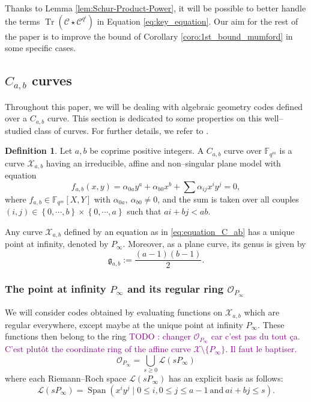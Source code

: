 \documentclass[a4paper]{amsart}
\theoremstyle{definition}
\newtheorem{definition}[thm]{Definition}
\theoremstyle{remark}
\newcommand{\calL}{\mathcal{L}}
\newcommand{\calC}{\mathcal{C}}
\newcommand{\calO}{\mathcal{O}}
\newcommand{\calX}{\mathcal{X}}
\newcommand{\fqm}{\mathbb{F}_{q^m}}
\newcommand{\Tr}[1]{\operatorname{Tr}\left(#1\right)}
\newcommand{\set}[1]{\left\{#1\right\}}
\newcommand{\Span}[1]{\operatorname{Span}\left(#1\right)}
\newcommand\jade[1]{\textcolor{purple}{#1}}
\begin{document}
Thanks to Lemma \ref{lem:Schur-Product-Power}, it will be possible to better handle the terms $\Tr{\calC\star \calC^{q^i}}$ in Equation \eqref{eq:key_equation}. Our aim for the rest of the paper is to improve the bound of Corollary \ref {coro:1st_bound_mumford} in some specific cases.

\subsection{$C_{a,b}$ curves} \label{section:C_a,b_codes}
Throughout this paper, we will be dealing with algebraic geometry codes defined over a $C_{a,b}$ curve. This section is dedicated to some properties on this well--studied class of curves. For further details, we refer to \cite{Miu93}. 

\begin{definition} \label{def:C_ab_curves} 
Let $a,b$ be coprime positive integers. A $C_{a,b}$ curve over $\fqm$ is a curve $\calX_{a,b}$ having an irreducible, affine and non--singular plane model with equation
\begin{equation} \label{eq:equation_C_ab}
f_{a,b}(x,y) = \alpha_{0a}y^a + \alpha_{b0}x^b + \sum \alpha_{ij}x^iy^j = 0,
\end{equation}
where $f_{a,b} \in \fqm[X,Y]$ with $\alpha_{0a}, \: \alpha_{b0} \neq 0$, and the sum is taken over all couples $(i,j) \in \set{0,\cdots,b} \times \set{0,\cdots,a}$ such that $ai+bj < ab$.
\end{definition}
Any curve $\calX_{a,b}$ defined by an equation as in \eqref{eq:equation_C_ab} has a unique point at infinity, denoted by $P_{\infty}$. Moreover, as a plane curve, its genus is given by
\[\mathfrak{g}_{a,b}:=\dfrac{(a-1)(b-1)}{2}.\]

\subsubsection{The point at infinity $P_\infty$ and its regular ring $\calO_{P_\infty}$}

We will consider codes obtained by evaluating functions on $\calX_{a,b}$ which are regular everywhere, except maybe at the unique point at infinity $P_\infty$. These functions then belong to the ring 
\jade{TODO : changer $\calO_{P_\infty}$ car c'est pas du tout ça. C'est plutôt the coordinate ring of the affine curve $\calX \setminus \{P_\infty\}$. Il faut le baptiser.}
\begin{equation}\label{eq:O_Pinf}
\mathcal{O}_{P_\infty}=\bigcup_{s \geq 0} \calL(s P_\infty)
\end{equation} %
where each Riemann--Roch space $\calL(s P_\infty)$ has an explicit basis as follows:
\begin{equation} \label{eq:basis_L(sP_inf)}
    \calL(sP_{\infty}) = \Span{x^iy^j \mid 0 \leq i, 0\leq j\leq a-1 \ \mathrm{and} \ ai+bj \leq s}.
\end{equation}
\end{document}
